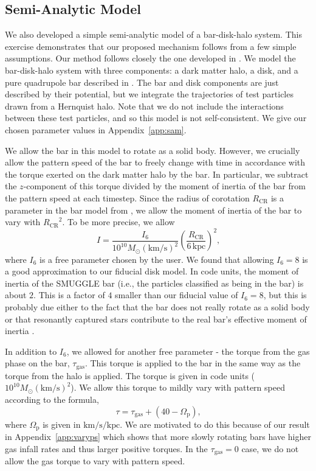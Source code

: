\documentclass[twocolumn,linenumbers]{aastex631}
\newcommand{\RCR}{\ensuremath{R_{\textrm{CR}}}}
\newcommand{\kms}{\ensuremath{\textrm{km}/\textrm{s}}}
\newcommand{\SMUGGLE}{SMUGGLE}
\newcommand{\Msun}{\ensuremath{M_{\odot}}}
\begin{document}
\subsection{Semi-Analytic Model}
We also developed a simple semi-analytic model of a bar-disk-halo system. This
exercise demonstrates that our proposed mechanism follows from a few simple
assumptions. Our method follows closely the one developed in
\citet{2022MNRAS.513..768C}. We model the bar-disk-halo system with three
components: a dark matter \citet{1990ApJ...356..359H} halo, a
\citet{1975PASJ...27..533M} disk, and a pure quadrupole bar
described in \citet{2022MNRAS.513..768C}. The bar and disk components are just
described by their potential, but we integrate the trajectories of test
particles drawn from a Hernquist halo. Note that we do not include the
interactions between these test particles, and so this model is not
self-consistent. We give our chosen parameter values in Appendix~\ref{app:sam}.

We allow the bar in this model to rotate as a solid body. However, we crucially
allow the pattern speed of the bar to freely change with time in accordance with
the torque exerted on the dark matter halo by the bar. In particular, we
subtract the $z$-component of this torque divided by the moment of inertia of
the bar from the pattern speed at each timestep. Since the radius of corotation
\RCR{} is a parameter in the bar model from \citet{2022MNRAS.513..768C}, we
allow the moment of inertia of the bar to vary with ${\RCR}^2$. To be more
precise, we allow
\begin{equation}
I = \frac{I_6}{10^{10} \Msun (\kms)^2} \left( \frac{\RCR}{6\,\textrm{kpc}} \right)^2\textrm{,}
\end{equation}
where $I_6$ is a free parameter chosen by the user. We found that allowing
$I_6=8$ is a good approximation to our fiducial disk model. In code units, the
moment of inertia of the \SMUGGLE{} bar (i.e., the particles classified as being in
the bar) is about $2$. This is a factor of $4$ smaller than our fiducial value
of $I_6=8$, but this is probably due either to the fact that the bar does not
really rotate as a solid body or that resonantly captured stars contribute to
the real bar's effective moment of inertia \citep{1985MNRAS.213..451W}.

In addition to $I_6$, we allowed for another free parameter - the torque from
the gas phase on the bar, $\tau_{\textrm{gas}}$. This torque is applied to the
bar in the same way as the torque from the halo is applied. The torque is given
in code units ($10^{10}\Msun \left(\kms\right)^2$). We allow this torque to
mildly vary with pattern speed according to the formula,
\begin{equation}
\tau = \tau_{\textrm{gas}} + (40 - \Omega_{\textrm{p}})\textrm{,}
\end{equation}
where $\Omega_{\textrm{p}}$ is given in $\kms/\textrm{kpc}$. We are motivated to
do this because of our result in Appendix~\ref{app:varyps} which shows that more
slowly rotating bars have higher gas infall rates and thus larger positive
torques. In the $\tau_{\textrm{gas}}=0$ case, we do not allow the gas torque to
vary with pattern speed.
\end{document}
